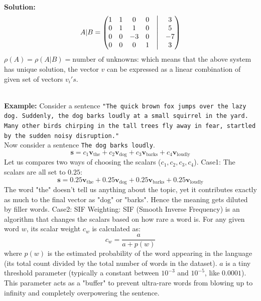 \documentclass[DIV=20,oneside]{scrartcl}
\newcommand{\solution}{
	\noindent\textbf{\\Solution: }
}
\newcommand{\example}{
	\noindent\textbf{\\Example: }
}
\begin{document}
\solution $$A|B = \begin{pmatrix} 
	1 & 1 & 0 & 0 & \bigm| & 3 \\ 
	0 & 1 & 1 & 0 & \bigm| & 5 \\ 
	0 & 0 & -3 & 0 & \bigm| & -7 \\
	0 & 0 & 0 & 1 & \bigm| & 3 
\end{pmatrix}$$
$\rho(A)=\rho(A|B)= \text{number of unknowns}$: which means that the above system has unique solution, the vector $v$ can be expressed as a linear combination of given set of vectors $v_i's$.

\example Consider a sentence \texttt{"The quick brown fox jumps over the lazy dog. Suddenly, the dog barks loudly at a small squirrel in the yard. Many other birds chirping in the tall trees fly away in fear, startled by the sudden noisy disruption."}
\\
Now consider a sentence \texttt{The dog barks loudly}. $$\mathbf{s} = c_1\mathbf{v}_{\text{the}} + c_2\mathbf{v}_{\text{dog}} + c_3\mathbf{v}_{\text{barks}} + c_4\mathbf{v}_{\text{loudly}}$$ Let us compares two ways of choosing the scalars ($c_1, c_2, c_3, c_4$).
Case1:  The scalars are all set to $0.25$:\\
$$\mathbf{s} = 0.25\mathbf{v}_{\text{the}} + 0.25\mathbf{v}_{\text{dog}} + 0.25\mathbf{v}_{\text{barks}} + 0.25\mathbf{v}_{\text{loudly}}$$
The word "the" doesn't tell us anything about the topic, yet it contributes exactly as much to the final vector as "dog" or "barks". Hence the meaning gets diluted by filler words.
Case2: SIF Weighting:
SIF (Smooth Inverse Frequency) is an algorithm that changes the scalars based on how rare a word is. For any given word $w$, its scalar weight $c_w$ is calculated as:$$c_w = \frac{a}{a + p(w)}$$
where $p(w)$ is the estimated probability of the word appearing in the language (its total count divided by the total number of words in the dataset). $a$ is a tiny threshold parameter (typically a constant between $10^{-3}$ and $10^{-5}$, like $0.0001$). This parameter acts as a "buffer" to prevent ultra-rare words from blowing up to infinity and completely overpowering the sentence.
\end{document}
